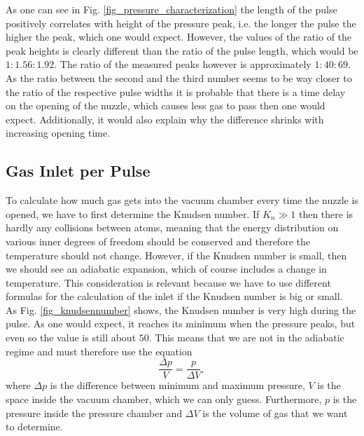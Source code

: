 \documentclass[a4paper,10pt]{article}
\begin{document}
As one can see in Fig. \ref{fig_pressure_characterization} the length of the pulse positively correlates with height of the pressure peak, i.e. the longer the pulse the higher the peak, which one would expect. However, the values of the ratio of the peak heights is clearly different than the ratio of the pulse length, which would be $1:1.56:1.92$. The ratio of the measured peaks however is approximately $1:40:69$. As the ratio between the second and the third number seems to be way closer to the ratio of the respective pulse widths it is probable that there is a time delay on the opening of the nuzzle, which causes less gas to pass then one would expect. Additionally, it would also explain why the difference shrinks with increasing opening time. 
\\

\subsection{Gas Inlet per Pulse}
To calculate how much gas gets into the vacuum chamber every time the nuzzle is opened, we have to first determine the Knudsen number. If $K_n \gg 1$ then there is hardly any collisions between atoms, meaning that the energy distribution on various inner degrees of freedom should be conserved and therefore the temperature should not change. However, if the Knudsen number is small, then we should see an adiabatic expansion, which of course includes a change in temperature. This consideration is relevant because we have to use different formulas for the calculation of the inlet if the Knudsen number is big or small. 
\\
As Fig. \ref{fig_knudsennumber} shows, the Knudsen number is very high during the pulse. As one would expect, it reaches its minimum when the pressure peaks, but even so the value is still about $50$. %
This means that we are not in the adiabatic regime and must therefore use the equation 
\begin{equation}
	\frac{\Delta p}{V} = \frac{p}{\Delta V},
\end{equation}
where $\Delta p$ is the difference between minimum and maximum pressure, $V$ is the space inside the vacuum chamber, which we can only guess. Furthermore, $p$ is the pressure inside the pressure chamber and $\Delta V$ is the volume of gas that we want to determine. 
\end{document}

